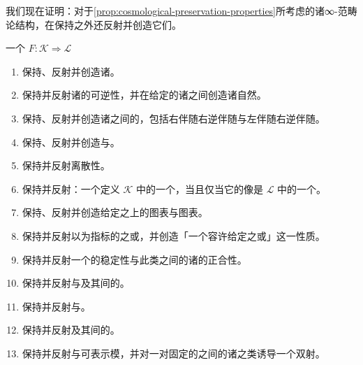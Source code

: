 我们现在证明：\trBiequivalence{}对于\cref{prop:cosmological-preservation-properties}所考虑的诸∞-范畴论结构，在保持之外还反射并创造它们。

\begin{proposition}\label{prop:biequivalence-reflects-creates}
一个\trCosmologicalBiequivalence{} $F\colon\mathcal{K}\Rightarrow\mathcal{L}$
\begin{enumerate}[label=(\roman*)]
\item 保持、反射并创造诸\trEquivalence。
\item 保持并反射诸\trNaturalTransformation{}的可逆性，并在给定的诸\trFunctor{}之间创造诸自然\trIsomorphism。
\item 保持、反射并创造诸\trInfinityCategory{}之间的\trAdjunction，包括右伴随右逆伴随与左伴随右逆伴随。
\item 保持、反射并创造\trFiberedAdjunction{}与\trFiberedEquivalence。
\item 保持并反射离散性。
\item 保持并反射\trCommaInfinityCategory：一个\trCell{}定义 $\mathcal{K}$ 中的一个\trCommaCone，当且仅当它的像是 $\mathcal{L}$ 中的一个\trCommaCone。
\item 保持、反射并创造给定\trCospan{}之上的\trAbsoluteRightLifting{}图表与\trAbsoluteLeftLifting{}图表。
\item 保持并反射以\trSimplicialSet{}为指标的\trDiagram{}之\trLimit{}或\trColimit，并创造「一个\trInfinityCategory{}容许给定\trDiagram{}之\trLimit{}或\trColimit」这一性质。
\item 保持并反射一个\trInfinityCategory{}的稳定性与此类\trInfinityCategory{}之间的诸\trFunctor{}的正合性。
\item 保持并反射\trCartesianFibration{}与\trCocartesianFibration{}及其间的\trCartesianFunctor。
\item 保持并反射\trDiscreteCartesianFibration{}与\trDiscreteCocartesianFibration。
\item 保持并反射\trTwoSidedFibration{}及其间的\trCartesianFunctor。
\item 保持并反射\trModule{}与可表示模，并对一对固定的\trInfinityCategory{}之间的诸\trModule{}之\trEquivalence{}类诱导一个双射。
\end{enumerate}
\end{proposition}

